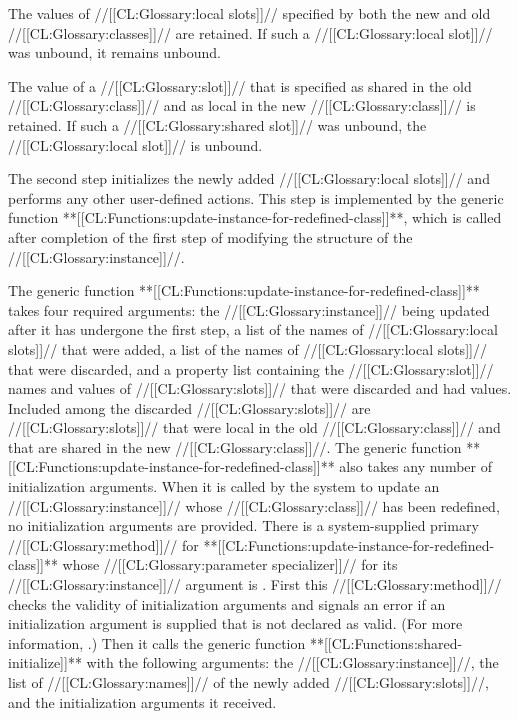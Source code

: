 The values of //[[CL:Glossary:local slots]]// specified by both the new and old //[[CL:Glossary:classes]]// are retained. If such a //[[CL:Glossary:local slot]]// was unbound, it remains unbound.

The value of a //[[CL:Glossary:slot]]// that is specified as shared in the old  //[[CL:Glossary:class]]// and as local in the new //[[CL:Glossary:class]]// is retained.  If such  a //[[CL:Glossary:shared slot]]// was unbound, the //[[CL:Glossary:local slot]]// is unbound.

\endsubsubsection%


The second step initializes the newly added //[[CL:Glossary:local slots]]// and performs any other user-defined actions.  This step is implemented by the generic function **[[CL:Functions:update-instance-for-redefined-class]]**, which is called after completion of the first step of modifying the structure of the //[[CL:Glossary:instance]]//.

The generic function **[[CL:Functions:update-instance-for-redefined-class]]** takes four required arguments: the //[[CL:Glossary:instance]]// being updated after it has undergone the first step, a list of the names of //[[CL:Glossary:local slots]]// that were added, a list of the names of //[[CL:Glossary:local slots]]// that were discarded, and a property list containing the //[[CL:Glossary:slot]]// names and values of  //[[CL:Glossary:slots]]// that were discarded and had values.  Included among the discarded //[[CL:Glossary:slots]]// are //[[CL:Glossary:slots]]// that were local in the old //[[CL:Glossary:class]]// and that are shared in the new //[[CL:Glossary:class]]//.
                       The generic function **[[CL:Functions:update-instance-for-redefined-class]]** also takes any number of initialization arguments.  When it is called by the system to update an //[[CL:Glossary:instance]]// whose //[[CL:Glossary:class]]//  has been redefined, no initialization arguments are provided.
                                                There is a system-supplied primary //[[CL:Glossary:method]]// for  **[[CL:Functions:update-instance-for-redefined-class]]** whose //[[CL:Glossary:parameter specializer]]// for its //[[CL:Glossary:instance]]// argument is .   First this //[[CL:Glossary:method]]// checks the validity of initialization arguments and signals an error if an initialization argument is supplied that is not declared as valid.  (For more information, \seesection\DeclaringInitargValidity.) Then it calls the generic function **[[CL:Functions:shared-initialize]]** with the following arguments: the  //[[CL:Glossary:instance]]//, the list of //[[CL:Glossary:names]]// of  the newly added //[[CL:Glossary:slots]]//, and the initialization arguments it received.

